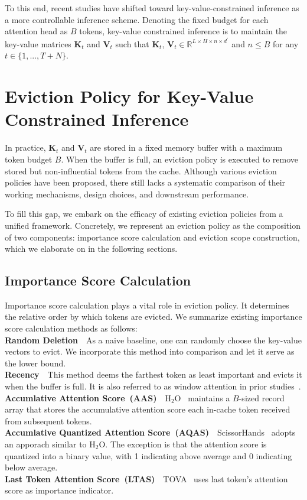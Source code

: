 To this end, recent studies have shifted toward key-value-constrained inference as a more controllable inference scheme. Denoting the fixed budget for each attention head as $B$ tokens, key-value constrained inference is to maintain the key-value matrices $\bm{K}_t$ and $\bm{V}_t$ such that 
$\bm{K}_t$, $\bm{V}_t\in \mathbb{R}^{L\times H\times n\times d^\prime}$ and $n\leq B$ for any $t\in\{1,...,T+N\}$. 

\section{Eviction Policy for Key-Value Constrained Inference}
In practice, $\bm{K}_t$ and $\bm{V}_t$ are stored in a fixed memory buffer with a maximum token budget $B$. When the buffer is full, an eviction policy is executed to remove stored but non-influential tokens from the cache. Although various eviction policies have been proposed, there still lacks a systematic comparison of their working mechanisms, design choices, and downstream performance. 

To fill this gap, we embark on the efficacy of existing eviction policies from a unified 
framework. Concretely, we represent an eviction policy as the composition of two components: 
importance score calculation and eviction scope construction, which we elaborate 
on in the following sections. 
\subsection{Importance Score Calculation}
\label{sec:isc}
Importance score calculation plays a vital role in eviction policy. It determines the relative order by which tokens are evicted. We summarize existing importance score calculation methods as follows: \\
\textbf{Random Deletion}~~As a naive baseline, one can randomly choose the key-value vectors to evict. We incorporate this method into comparison and let it serve as the lower bound. \\
\textbf{Recency}~~This method deems the farthest token as least important and evicts it when the buffer is full. It is also referred to as window attention in prior studies~\cite{etc,longformer,xiao2023efficient}. \\
\textbf{Accumlative Attention Score~(AAS)}~~$\text{H}_{\text{2}}$O~\cite{h2o} maintains a $B$-sized record array that stores the accumulative attention score each in-cache token received from subsequent tokens. \\
\textbf{Accumlative Quantized Attention Score~(AQAS)}~~ScissorHands~\cite{liu2023scissorhands} adopts an apporach similar to $\text{H}_{\text{2}}$O. The exception is that the attention score is quantized into a binary value, with 1 indicating above average and 0 indicating below average. \\
\textbf{Last Token Attention Score~(LTAS)}~~TOVA~\cite{tova} uses last token's attention score as importance indicator.

